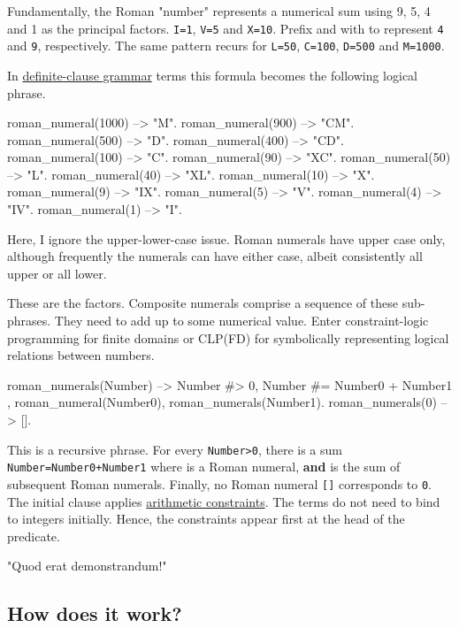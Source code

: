 Fundamentally, the Roman "number" represents a numerical sum using 9, 5,
4 and 1 as the principal factors. \verb$I=1$, \verb$V=5$ and \verb$X=10$. Prefix 
and  with  to represent \verb$4$ and \verb$9$, respectively. The same
pattern recurs for \verb$L=50$, \verb$C=100$, \verb$D=500$ and \verb$M=1000$.

In \href{https://www.metalevel.at/prolog/dcg}{definite-clause grammar} terms
this formula becomes the following logical phrase.

\begin{code}
roman_numeral(1000) --> "M".
roman_numeral(900)  --> "CM".
roman_numeral(500)  --> "D".
roman_numeral(400)  --> "CD".
roman_numeral(100)  --> "C".
roman_numeral(90)   --> "XC".
roman_numeral(50)   --> "L".
roman_numeral(40)   --> "XL".
roman_numeral(10)   --> "X".
roman_numeral(9)    --> "IX".
roman_numeral(5)    --> "V".
roman_numeral(4)    --> "IV".
roman_numeral(1)    --> "I".
\end{code}

Here, I ignore the upper-lower-case issue. Roman numerals have upper
case only, although frequently the numerals can have either case, albeit
consistently all upper or all lower.

These are the factors. Composite numerals comprise a sequence of these
sub-phrases. They need to add up to some numerical value. Enter
constraint-logic programming for finite domains or CLP(FD) for
symbolically representing logical relations between numbers.

\begin{code}
roman_numerals(Number) -->
    { Number #> 0,
      Number #= Number0 + Number1
    },
    roman_numeral(Number0),
    roman_numerals(Number1).
roman_numerals(0) --> [].
\end{code}

This is a recursive phrase. For every \verb$Number>0$, there is a sum
\verb$Number=Number0+Number1$ where  is a Roman numeral, \textbf{and}
 is the sum of subsequent Roman numerals. Finally, no Roman
numeral \verb$[]$ corresponds to \verb$0$. The initial clause applies \href{https://www.swi-prolog.org/man/clpfd.html}{arithmetic
constraints}. The terms do
not need to bind to integers initially. Hence, the constraints appear
first at the head of the predicate.

"Quod erat demonstrandum!"

\subsection{How does it work?}

